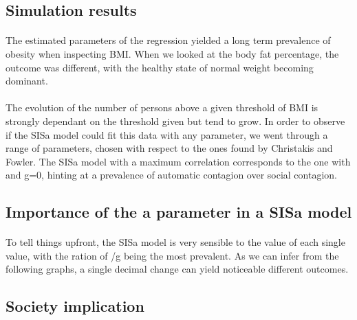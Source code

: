 \documentclass[11pt]{article}
\begin{document}
\subsection{Simulation results}
\paragraph{}
The estimated parameters of the regression yielded a long term prevalence of obesity when inspecting BMI. When we looked at the body fat percentage, the outcome was different, with the healthy state of normal weight becoming dominant.


\paragraph{}
The evolution of the number of persons above a given threshold of BMI is strongly dependant on the threshold given but tend to grow. In order to observe if the SISa model could fit this data with any parameter, we went through a range of parameters, chosen with respect to the ones found by Christakis and Fowler. The SISa model with a maximum correlation corresponds to the one with \beta{} and g=0, hinting at a prevalence of automatic contagion over social contagion. 

\subsection{Importance of the a parameter in a SISa model}
\paragraph{}
To tell things upfront, the SISa model is very sensible to the value of each single value, with the ration of \beta  \] /g being the most prevalent. As we can infer from the following graphs, a single decimal change can yield noticeable different outcomes.



\subsection{Society implication}
\end{document}

